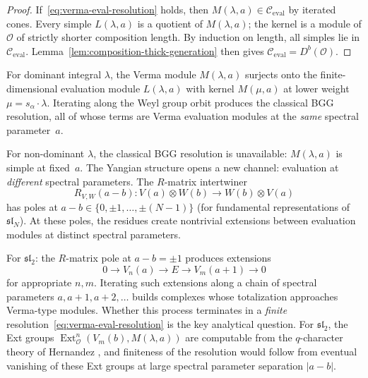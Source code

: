 \begin{proof}
If~\eqref{eq:verma-eval-resolution} holds, then
$M(\lambda, a) \in \mathcal{C}_{\mathrm{eval}}$ by iterated cones.
Every simple $L(\lambda, a)$ is a quotient of $M(\lambda, a)$;
the kernel is a module of $\mathcal{O}$ of strictly shorter
composition length.  By induction on length, all simples lie in
$\mathcal{C}_{\mathrm{eval}}$.
Lemma~\ref{lem:composition-thick-generation} then gives
$\mathcal{C}_{\mathrm{eval}} = D^b(\mathcal{O})$.
\end{proof}

\begin{remark}
\label{rem:bgg-spectral-parameter}
For dominant integral $\lambda$, the Verma module $M(\lambda, a)$
surjects onto the finite-dimensional evaluation module
$L(\lambda, a)$ with kernel $M(\mu, a)$ at lower weight
$\mu = s_\alpha \cdot \lambda$.  Iterating along the Weyl group
orbit produces the classical BGG resolution, all of whose terms are
Verma evaluation modules at the \emph{same} spectral parameter~$a$.

For non-dominant $\lambda$, the classical BGG resolution is
unavailable: $M(\lambda, a)$ is simple at fixed~$a$.  The Yangian
structure opens a new channel: evaluation at \emph{different}
spectral parameters.  The $R$-matrix intertwiner
\[
R_{V,W}(a - b)\colon V(a) \otimes W(b) \to W(b) \otimes V(a)
\]
has poles at $a - b \in \{0, \pm 1, \ldots, \pm (N-1)\}$
(for fundamental representations of $\mathfrak{sl}_N$).
At these poles, the residues create nontrivial extensions between
evaluation modules at distinct spectral parameters.

For $\mathfrak{sl}_2$: the $R$-matrix pole at $a - b = \pm 1$
produces extensions
\[
0 \to V_n(a) \to E \to V_m(a+1) \to 0
\]
for appropriate $n, m$.  Iterating such extensions along a chain
of spectral parameters $a, a+1, a+2, \ldots$ builds complexes
whose totalization approaches Verma-type modules.  Whether this
process terminates in a \emph{finite}
resolution~\eqref{eq:verma-eval-resolution} is the key analytical
question.  For $\mathfrak{sl}_2$, the Ext groups
$\operatorname{Ext}^n_{\mathcal{O}}(V_m(b), M(\lambda, a))$ are
computable from the $q$-character theory of Hernandez
\cite{Hernandez05}, and finiteness of the resolution would follow
from eventual vanishing of these Ext groups at large spectral
parameter separation $|a - b|$.
\end{remark}

